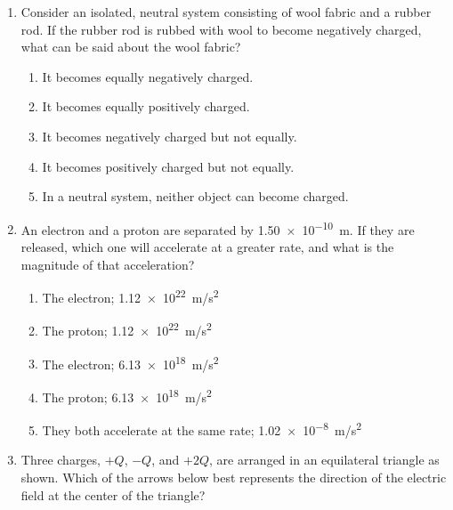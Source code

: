 \documentclass[11pt]{article}
\begin{document}
\begin{multicols}{2}
\begin{enumerate}[leftmargin=18pt]
  \item Consider an isolated, neutral system consisting of wool fabric and a
    rubber rod. If the rubber rod is rubbed with wool to become negatively
    charged, what can be said about the wool fabric?
    \begin{enumerate}[noitemsep,topsep=0pt,leftmargin=18pt,label=(\Alph*)]
    \item It becomes equally negatively charged.
    \item It becomes equally positively charged.
    \item It becomes negatively charged but not equally.
    \item It becomes positively charged but not equally.
    \item In a neutral system, neither object can become charged.
    \end{enumerate}
    \columnbreak
  \item An electron and a proton are separated by \SI{1.50e-10}{m}. If they are
    released, which one will accelerate at a greater rate, and what is the
    magnitude of that acceleration?
    \begin{enumerate}[noitemsep,topsep=0pt,leftmargin=18pt,label=(\Alph*)]
    \item The electron; \SI{1.12e22}{m/s^2}
    \item The proton; \SI{1.12e22}{m/s^2}
    \item The electron; \SI{6.13e18}{m/s^2}
    \item The proton; \SI{6.13e18}{m/s^2}
    \item They both accelerate at the same rate; \SI{1.02e-8}{m/s^2}
    \end{enumerate}

    \begin{center}
    \end{center}
    
  \item\vspace{-.2in} Three charges, $+Q$, $−Q$, and $+2Q$, are arranged in an
    equilateral triangle as shown. Which of the arrows below best represents
    the direction of the electric field at the center of the triangle?
  

\end{enumerate}
\end{multicols}
\end{document}
